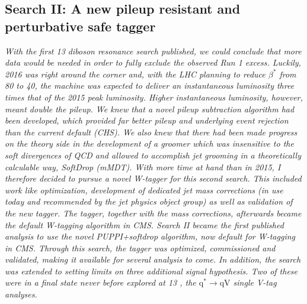 \vspace*{\fill}
\begin{centering}
\section{Search II: A new pileup resistant and perturbative safe tagger}
\label{searchII}
\textit{
With the first 13 \TeV diboson resonance search published, we could conclude that more data would be needed in order to fully exclude the observed Run 1 excess. Luckily, 2016 was right around the corner and, with the LHC planning to reduce $\beta^*$ from 80 \cm to 40, the machine was expected to deliver an instantaneous luminosity three times that of the 2015 peak luminosity. Higher instantaneous luminosity, however, meant double the pileup.
\newline
\newline
We knew that a novel pileup subtraction algorithm had been developed, which provided far better pileup and underlying event rejection than the current default (CHS). We also knew that there had been made progress on the theory side in the development of a groomer which was insensitive to the soft divergences of QCD and allowed to accomplish jet grooming in a theoretically calculable way, SoftDrop (mMDT). With more time at hand than in 2015, I therefore decided to pursue a novel W-tagger for this second search. This included work like optimization, development of dedicated jet mass corrections (in use today and recommended by the jet physics object group) as well as validation of the new tagger. The tagger, together with the mass corrections, afterwards became the default W-tagging algorithm in CMS.
\newline
\newline
Search II became the first published analysis to use the novel PUPPI+softdrop algorithm, now default for W-tagging in CMS. Through this search, the tagger was optimized, commissioned and validated, making it available for several analysis to come. In addition, the search was extended to setting limits on three additional signal hypothesis. Two of these were in a final state never before explored at 13 \TeV, the $\textrm{q}^* \rightarrow \textrm{qV}$ single V-tag analyses.
}
\end{centering}

